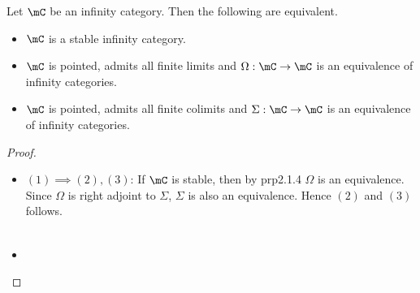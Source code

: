 \documentclass[a4paper]{article}
\begin{document}
\begin{prp}{}{} Let $\mC$ be an infinity category. Then the following are equivalent. 
\begin{itemize}
\item $\mC$ is a stable infinity category. 
\item $\mC$ is pointed, admits all finite limits and $\Omega:\mC\to\mC$ is an equivalence of infinity categories. 
\item $\mC$ is pointed, admits all finite colimits and $\Sigma:\mC\to\mC$ is an equivalence of infinity categories. 
\end{itemize} \tcbline
\begin{proof}~\\
\begin{itemize}
\item $(1)\implies(2),(3)$: If $\mC$ is stable, then by prp2.1.4 $\Omega$ is an equivalence. Since $\Omega$ is right adjoint to $\Sigma$, $\Sigma$ is also an equivalence. Hence $(2)$ and $(3)$ follows. \\~\\

\item 
\end{itemize}
\end{proof}
\end{prp}
\end{document}
